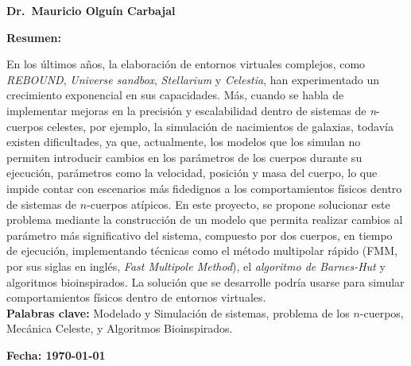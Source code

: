 \begin{titlepage}
\begin{center}
\begin{adjustwidth}{-2.5cm}{}
\begin{center}
                \vspace{5pt}
                
                {\fontsize{14}{14}\selectfont\textbf{Dr.\ Mauricio Olguín Carbajal}}
                
                \vspace{0.5cm}
                
                \begin{minipage}{\textwidth}
                    \begin{center}
                        \textbf{Resumen:}\\[0.3cm]
                    \end{center}
                    {\fontsize{12}{12}\selectfont
                    En los últimos años, la elaboración de entornos virtuales complejos, como \textit{REBOUND}, \textit{Universe sandbox}, \textit{Stellarium} y \textit{Celestia}, han experimentado un crecimiento exponencial en sus capacidades. Más, cuando se habla de implementar mejoras en la precisión y escalabilidad dentro de sistemas de \textit{n}-cuerpos celestes, por ejemplo, la simulación de nacimientos de galaxias, todavía existen dificultades, ya que, actualmente, los modelos que los simulan no permiten introducir cambios en los parámetros de los cuerpos durante su ejecución, parámetros como la velocidad, posición y masa del cuerpo, lo que impide contar con escenarios más fidedignos a los comportamientos  físicos dentro de sistemas de $n$-cuerpos atípicos. En este proyecto, se propone solucionar este problema mediante la construcción de un modelo que permita realizar cambios al parámetro más significativo del  sistema, compuesto por dos cuerpos, en tiempo de ejecución, implementando técnicas como el método multipolar rápido (FMM, por sus siglas en inglés, \textit{Fast Multipole Method}), el \textit{algoritmo de Barnes-Hut} y algoritmos bioinspirados. La solución que se desarrolle podría usarse para simular comportamientos físicos dentro de entornos virtuales.\\

                     \textbf{Palabras clave: } Modelado y Simulación de sistemas, problema de los $n$-cuerpos, Mecánica Celeste, y Algoritmos Bioinspirados.}
                \end{minipage}
                
                \vspace{0.7cm}
                
                \textbf{\large Fecha: \today}
            \end{center}
        \end{adjustwidth}
    \end{center}
\end{titlepage}